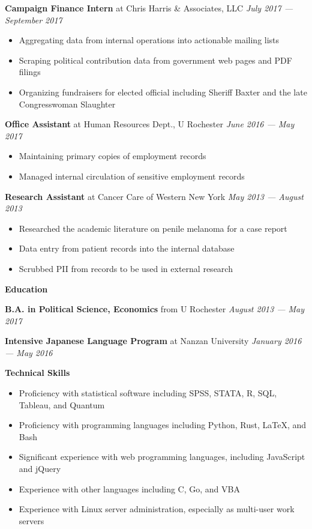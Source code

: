 \documentclass[12pt]{article}
\newenvironment{details}{
\begin{itemize}[label={}]
	\small \setlength{\itemsep}{0pt}
}{\end{itemize}}
\begin{document}
\normalsize
\textbf{Campaign Finance Intern} at Chris Harris \& Associates, LLC \hfill \textit{July 2017 --- September 2017}
\begin{details}
	\item Aggregating data from internal operations into actionable mailing lists
	\item Scraping political contribution data from government web pages and PDF filings
	\item Organizing fundraisers for elected official including Sheriff Baxter and the late Congresswoman Slaughter
\end{details}

\normalsize
\textbf{Office Assistant} at Human Resources Dept., U Rochester  \hfill \textit{June 2016 --- May 2017}
\begin{details}
	\item Maintaining primary copies of employment records
	\item Managed internal circulation of sensitive employment records
\end{details}

\normalsize
\textbf{Research Assistant} at Cancer Care of Western New York  \hfill \textit{May 2013 --- August 2013}
\begin{details}
	\item Researched the academic literature on penile melanoma for a case report
	\item Data entry from patient records into the internal database
	\item Scrubbed PII from records to be used in external research
\end{details}

\vspace{.1in}
\large
\textbf{Education} \hrulefill

\vspace{.05in}
\normalsize
\textbf{B.A. in Political Science, Economics} from U Rochester \hfill \textit{August 2013 --- May 2017}

\vspace{.05in}
\normalsize
\textbf{Intensive Japanese Language Program} at Nanzan University \hfill \textit{January 2016 --- May 2016}

\vspace{.1in}
\large
\textbf{Technical Skills} \hrulefill

\normalsize
\begin{details}
	\item Proficiency with statistical software including SPSS, STATA, R, SQL, Tableau, and Quantum
	\item Proficiency with programming languages including Python, Rust, \LaTeX, and Bash
	\item Significant experience with web programming languages, including JavaScript and jQuery
	\item Experience with other languages including C, Go, and VBA
	\item Experience with Linux server administration, especially as multi-user work servers
\end{details}
\end{document}
